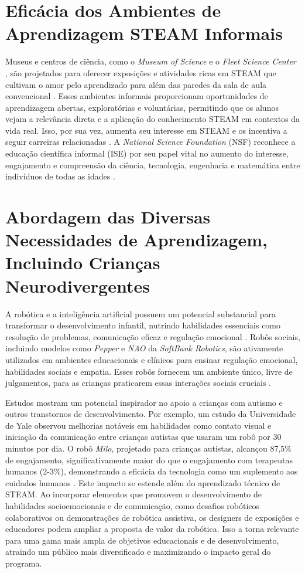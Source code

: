 \documentclass[%
  12pt,%
  a4paper,%
  oneside,%
  openright,%
  sumario = abnt-6027-2012,%
  chapter = TITLE,%
  pretextualoneside,%
  fontetimes,%
  semrecuonosumario,%
  usemakeindex,%
  pardeassinaturas,%
  english,%
  french,%
  spanish,%
  brazil,%
]{utfpr}%
\begin{document}
\section{Eficácia dos Ambientes de Aprendizagem STEAM Informais}
Museus e centros de ciência, como o \textit{Museum of Science} \cite{mosTeachingSTEM2025} e o \textit{Fleet Science Center} \cite{fleetScienceCenter2025}, são projetados para oferecer exposições e atividades ricas em STEAM que cultivam o amor pelo aprendizado para além das paredes da sala de aula convencional \cite{mosTeachingSTEM2025}. Esses ambientes informais proporcionam oportunidades de aprendizagem abertas, exploratórias e voluntárias, permitindo que os alunos vejam a relevância direta e a aplicação do conhecimento STEAM em contextos da vida real. Isso, por sua vez, aumenta seu interesse em STEAM e os incentiva a seguir carreiras relacionadas \cite{ross2024BeyondExhibits}. A \textit{National Science Foundation} (NSF) reconhece a educação científica informal (ISE) por seu papel vital no aumento do interesse, engajamento e compreensão da ciência, tecnologia, engenharia e matemática entre indivíduos de todas as idades \cite{informalscienceFramework2008}.

\section{Abordagem das Diversas Necessidades de Aprendizagem, Incluindo Crianças Neurodivergentes}
\label{sec:neurodivergentes}
A robótica e a inteligência artificial possuem um potencial substancial para transformar o desenvolvimento infantil, nutrindo habilidades essenciais como resolução de problemas, comunicação eficaz e regulação emocional \cite{behavioralHealthRoboticsAI2025}. Robôs sociais, incluindo modelos como \emph{Pepper} e \emph{NAO} da \textit{SoftBank Robotics}, são ativamente utilizados em ambientes educacionais e clínicos para ensinar regulação emocional, habilidades sociais e empatia. Esses robôs fornecem um ambiente único, livre de julgamentos, para as crianças praticarem essas interações sociais cruciais \cite{behavioralHealthRoboticsAI2025}.

Estudos mostram um potencial inspirador no apoio a crianças com autismo e outros transtornos de desenvolvimento. Por exemplo, um estudo da Universidade de Yale observou melhorias notáveis em habilidades como contato visual e iniciação da comunicação entre crianças autistas que usaram um robô por 30 minutos por dia. O robô \emph{Milo}, projetado para crianças autistas, alcançou 87,5\% de engajamento, significativamente maior do que o engajamento com terapeutas humanos (2-3\%), demonstrando a eficácia da tecnologia como um suplemento aos cuidados humanos \cite{behavioralHealthRoboticsAI2025}. Este impacto se estende além do aprendizado técnico de STEAM. Ao incorporar elementos que promovem o desenvolvimento de habilidades socioemocionais e de comunicação, como desafios robóticos colaborativos ou demonstrações de robótica assistiva, os designers de exposições e educadores podem ampliar a proposta de valor da robótica. Isso a torna relevante para uma gama mais ampla de objetivos educacionais e de desenvolvimento, atraindo um público mais diversificado e maximizando o impacto geral do programa.
\end{document}
